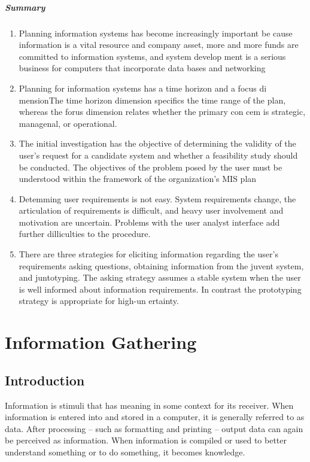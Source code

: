 \documentclass[a4paper,12pt]{report}
\begin{document}
\paragraph{Summary}
\begin{enumerate}
	\item Planning information systems has become increasingly important be cause information is a vital resource and company asset, more and more funds are committed to information systems, and system develop ment is a serious business for computers that incorporate data bases and networking
	\item Planning for information systems has a time horizon and a focus di mensionThe time horizon dimension specifics the time range of the plan, whereas the forus dimension relates whether the primary con cem is strategic, managenal, or operational.
	\item The initial investigation has the objective of determining the validity of the user's request for a candidate system and whether a feasibility study should be conducted. The objectives of the problem posed by the user must be understood within the framework of the organization's MIS plan
	\item Detemming user requirements is not easy. System requirements change, the articulation of requirements is difficult, and heavy user involvement and motivation are uncertain. Problems with the user analyst interface add further dilliculties to the procedure.
	\item There are three strategies for eliciting information regarding the user's requirements asking questions, obtaining information from the juvent system, and juntotyping. The asking strategy assumes a stable system when the user is well informed about information requirements. In contrast the prototyping strategy is appropriate for high-un ertainty.
\end{enumerate}
\chapter{Information Gathering}
\section{Introduction}
Information is stimuli that has meaning in some context for its receiver. When information is entered into and stored in a computer, it is generally referred to as data. After processing -- such as formatting and printing -- output data can again be perceived as information. When information is compiled or used to better understand something or to do something, it becomes knowledge.
\end{document}
